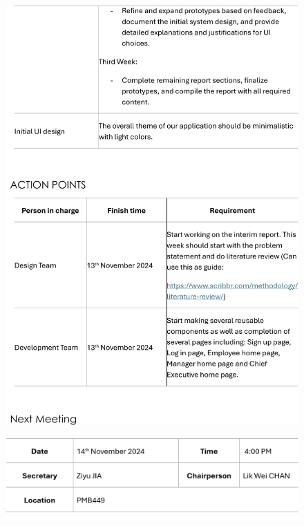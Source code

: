 \documentclass[a4paper,12pt, oneside]{report}
\begin{document}
\begin{appendices}
\begin{figure}[H]
    \includegraphics[width=\textwidth]{Minutes/Minutes_4-cropped-3.png}
\end{figure}
\newpage
\begin{figure}[H]
    \centering
    \includegraphics[width=\textwidth]{Minutes/Minutes_4-cropped-4.png}
\end{figure}

\end{appendices}
\end{document}
